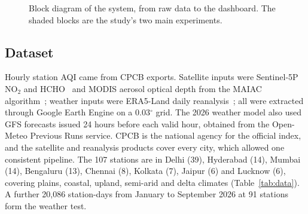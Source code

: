 \documentclass[pdflatex,sn-mathphys-num]{sn-jnl}
\begin{document}
\begin{figure}[!htbp]
\centering
{}
\caption{Block diagram of the system, from raw data to the dashboard. The shaded blocks are the study's two main experiments.}\label{fig:block}
\end{figure}


\subsection{Dataset}\label{sec:data}
Hourly station AQI came from CPCB exports. Satellite inputs were Sentinel-5P NO$_2$ and HCHO~\cite{veefkind} and MODIS aerosol optical depth from the MAIAC algorithm~\cite{lyapustin}; weather inputs were ERA5-Land daily reanalysis~\cite{munoz}; all were extracted through Google Earth Engine on a 0.03$^{\circ}$ grid. The 2026 weather model also used GFS forecasts issued 24 hours before each valid hour, obtained from the Open-Meteo Previous Runs service. CPCB is the national agency for the official index, and the satellite and reanalysis products cover every city, which allowed one consistent pipeline. The 107 stations are in Delhi (39), Hyderabad (14), Mumbai (14), Bengaluru (13), Chennai (8), Kolkata (7), Jaipur (6) and Lucknow (6), covering plains, coastal, upland, semi-arid and delta climates (Table~\ref{tab:data}). A further 20,086 station-days from January to September 2026 at 91 stations form the weather test.
\end{document}
